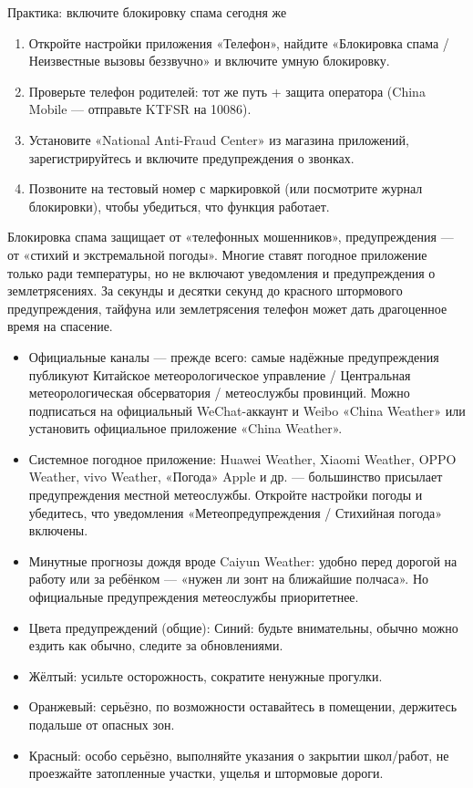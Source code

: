\begin{tcbpractice}{Практика: включите блокировку спама сегодня же}
\begin{enumerate}
  \item Откройте настройки приложения «Телефон», найдите «Блокировка спама / Неизвестные вызовы беззвучно» и включите умную блокировку.
  \item Проверьте телефон родителей: тот же путь + защита оператора (China Mobile — отправьте KTFSR на 10086).
  \item Установите «National Anti-Fraud Center» из магазина приложений, зарегистрируйтесь и включите предупреждения о звонках.
  \item Позвоните на тестовый номер с маркировкой (или посмотрите журнал блокировки), чтобы убедиться, что функция работает.
\end{enumerate}

\end{tcbpractice}


Блокировка спама защищает от «телефонных мошенников», предупреждения — от «стихий и экстремальной погоды». Многие ставят погодное приложение только ради температуры, но не включают уведомления и предупреждения о землетрясениях. За секунды и десятки секунд до красного штормового предупреждения, тайфуна или землетрясения телефон может дать драгоценное время на спасение.


\begin{itemize}
  \item Официальные каналы — прежде всего: самые надёжные предупреждения публикуют Китайское метеорологическое управление / Центральная метеорологическая обсерватория / метеослужбы провинций. Можно подписаться на официальный WeChat-аккаунт и Weibo «China Weather» или установить официальное приложение «China Weather».
  \item Системное погодное приложение: Huawei Weather, Xiaomi Weather, OPPO Weather, vivo Weather, «Погода» Apple и др. — большинство присылает предупреждения местной метеослужбы. Откройте настройки погоды и убедитесь, что уведомления «Метеопредупреждения / Стихийная погода» включены.
  \item Минутные прогнозы дождя вроде Caiyun Weather: удобно перед дорогой на работу или за ребёнком — «нужен ли зонт на ближайшие полчаса». Но официальные предупреждения метеослужбы приоритетнее.
  \item Цвета предупреждений (общие): Синий: будьте внимательны, обычно можно ездить как обычно, следите за обновлениями.
  \item Жёлтый: усильте осторожность, сократите ненужные прогулки.
  \item Оранжевый: серьёзно, по возможности оставайтесь в помещении, держитесь подальше от опасных зон.
  \item Красный: особо серьёзно, выполняйте указания о закрытии школ/работ, не проезжайте затопленные участки, ущелья и штормовые дороги.
\end{itemize}

